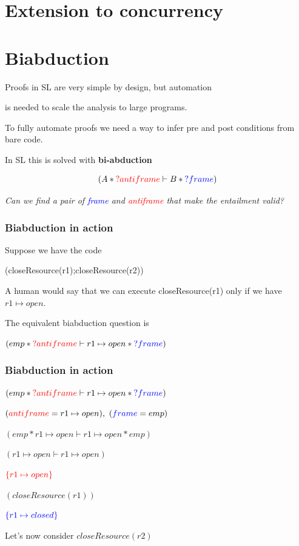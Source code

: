 \documentclass[professionalfont]{beamer}
\begin{document}
    \section{Extension to concurrency}
    \section{Biabduction}
    \begin{frame}
        Proofs in SL are very simple by design, but automation

        is needed to scale the analysis to large programs. 
        
        To fully automate proofs we need a way to infer pre and post conditions from bare code.
        
        
        \bigskip
        In SL this is solved with \textbf{bi-abduction}
        \pause
        \begin{card} 
            $$
            (A \ast \textcolor{red}{?antiframe} \vdash B \ast \textcolor{blue}{?frame})
            $$
        \end{card}
        \bigskip
        \emph{Can we find a pair of \textcolor{blue}{frame} and \textcolor{red}{antiframe} that make the entailment valid?}
    \end{frame}
    \begin{frame}
        \frametitle{Biabduction in action}

        Suppose we have the code
        \begin{center}
            (closeResource(r1);closeResource(r2))
        \end{center}
        A human would say that we can execute closeResource(r1) only if we have
        $r1 \mapsto open$.

        The equivalent biabduction question is
        \begin{card}
            $(emp \ast \textcolor{red}{?antiframe} \vdash r1 \mapsto open \ast \textcolor{blue}{?frame})$
        \end{card}
    \end{frame}
    \begin{frame}
        \frametitle{Biabduction in action}
        $(emp \ast \textcolor{red}{?antiframe} \vdash r1 \mapsto open \ast \textcolor{blue}{?frame})$
        \small
        
        \bigskip
        \pause
        $(\textcolor{red}{antiframe} = r1 \mapsto open),\ (\textcolor{blue}{frame}=emp)$

        \bigskip
        \pause
        $ (emp \ast r1 \mapsto open \vdash r1 \mapsto open \ast emp)$

        $ ( r1 \mapsto open \vdash r1 \mapsto open)$

        \bigskip
        \pause
        $\textcolor{red}{\{r1 \mapsto open\}}$
        
        $(closeResource(r1))$
        
        $\textcolor{blue}{\{r1 \mapsto closed\}}$

        \bigskip
        \pause
        \normalsize
        Let's now consider $closeResource(r2)$

    \end{frame}
\end{document}

